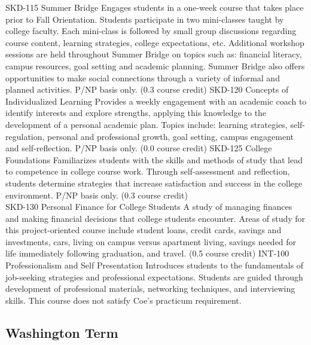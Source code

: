 \documentclass[
  letterpaper,
]{scrbook}
\begin{document}
SKD-115 Summer Bridge Engages students in a one-week course that takes
place prior to Fall Orientation. Students participate in two
mini-classes taught by college faculty. Each mini-class is followed by
small group discussions regarding course content, learning strategies,
college expectations, etc. Additional workshop sessions are held
throughout Summer Bridge on topics such as: financial literacy, campus
resources, goal setting and academic planning. Summer Bridge also offers
opportunities to make social connections through a variety of informal
and planned activities. P/NP basis only. (0.3 course credit) SKD-120
Concepts of Individualized Learning Provides a weekly engagement with an
academic coach to identify interests and explore strengths, applying
this knowledge to the development of a personal academic plan. Topics
include: learning strategies, self-regulation, personal and professional
growth, goal setting, campus engagement and self-reflection. P/NP basis
only. (0.0 course credit) SKD-125 College Foundations Familiarizes
students with the skills and methods of study that lead to competence in
college course work. Through self-assessment and reflection, students
determine strategies that increase satisfaction and success in the
college environment. P/NP basis only. (0.3 course credit)\\
SKD-130 Personal Finance for College Students A study of managing
finances and making financial decisions that college students encounter.
Areas of study for this project-oriented course include student loans,
credit cards, savings and investments, cars, living on campus versus
apartment living, savings needed for life immediately following
graduation, and travel. (0.5 course credit) INT-100 Professionalism and
Self Presentation Introduces students to the fundamentals of job-seeking
strategies and professional expectations. Students are guided through
development of professional materials, networking techniques, and
interviewing skills. This course does not satisfy Coe's practicum
requirement.

\hypertarget{washington-term-1}{%
\subsection{Washington Term}\label{washington-term-1}}
\end{document}

